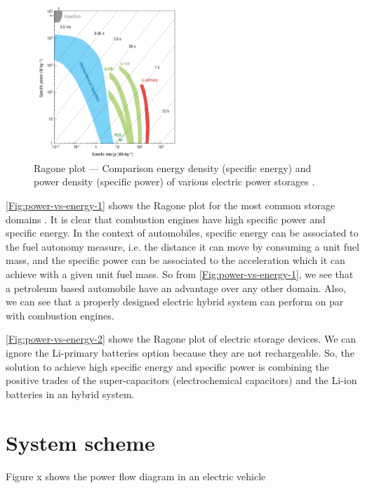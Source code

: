 \documentclass[journal]{IEEEtran}
\begin{document}
\begin{figure}
	\centering
	\includegraphics[width=0.48\textwidth]{power-vs-energy-density}
	\caption{Ragone plot --- Comparison energy density (specific energy) and power density (specific power) of various electric power storages \cite{simon2008materials}.}
	\label{Fig:power-vs-energy-2}
\end{figure}
\autoref{Fig:power-vs-energy-1} shows the Ragone plot for the most common storage domains \cite{simon2008materials}. It is clear that combustion engines have high specific power and specific energy. In the context of automobiles, specific energy can be associated to the fuel autonomy measure, i.e. the distance it can move by consuming a unit fuel mass, and the specific power can be associated to the acceleration which it can achieve with a given unit fuel mass. So from \autoref{Fig:power-vs-energy-1}, we see that a petroleum based automobile have an advantage over any other domain. Also, we can see that a properly designed electric hybrid system can perform on par with combustion engines.

\autoref{Fig:power-vs-energy-2} shows the Ragone plot of electric storage devices. We can ignore the Li-primary batteries option because they are not rechargeable. So, the solution to achieve high specific energy and specific power is combining the positive trades of the super-capacitors (electrochemical capacitors) and the Li-ion batteries in an hybrid system.
\section{System scheme}

Figure x shows the power flow diagram in an electric vehicle 



\end{document}
